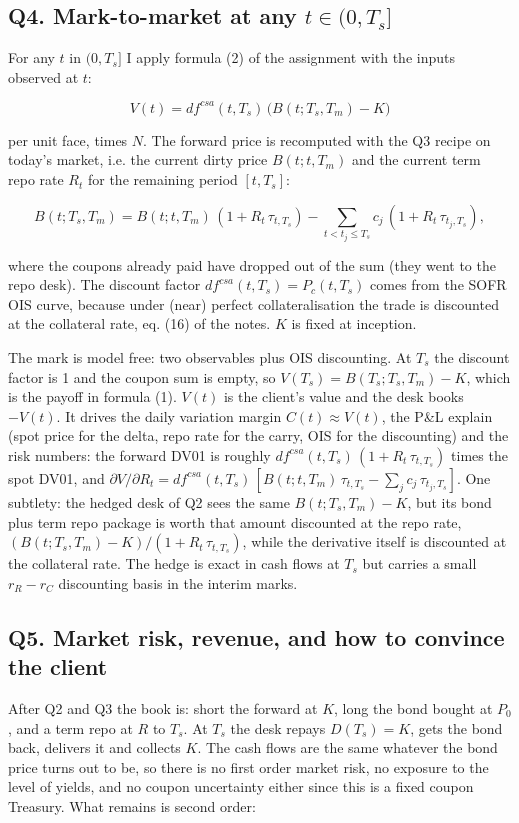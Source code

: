 \documentclass[11pt]{article}
\begin{document}
\subsection*{Q4. Mark-to-market at any $t \in (0, T_s]$}

For any $t$ in $(0,T_s]$ I apply formula (2) of the assignment with the inputs observed at $t$:

\[V(t) = df^{csa}(t,T_s)\,\bigl(B(t;T_s,T_m) - K\bigr)\]

per unit face, times $N$. The forward price is recomputed with the Q3 recipe on today's market, i.e. the current dirty price $B(t;t,T_m)$ and the current term repo rate $R_t$ for the remaining period $[t,T_s]$:

\[B(t;T_s,T_m) = B(t;t,T_m)\,(1 + R_t\,\tau_{t,T_s}) - \sum_{t<t_j\le T_s} c_j\,(1 + R_t\,\tau_{t_j,T_s}),\]

where the coupons already paid have dropped out of the sum (they went to the repo desk). The discount factor $df^{csa}(t,T_s) = P_c(t,T_s)$ comes from the SOFR OIS curve, because under (near) perfect collateralisation the trade is discounted at the collateral rate, eq. (16) of the notes. $K$ is fixed at inception.

The mark is model free: two observables plus OIS discounting. At $T_s$ the discount factor is 1 and the coupon sum is empty, so $V(T_s) = B(T_s;T_s,T_m) - K$, which is the payoff in formula (1). $V(t)$ is the client's value and the desk books $-V(t)$. It drives the daily variation margin $C(t) \approx V(t)$, the P\&L explain (spot price for the delta, repo rate for the carry, OIS for the discounting) and the risk numbers: the forward DV01 is roughly $df^{csa}(t,T_s)\,(1 + R_t\,\tau_{t,T_s})$ times the spot DV01, and $\partial V/\partial R_t = df^{csa}(t,T_s)\,[B(t;t,T_m)\,\tau_{t,T_s} - \sum_j c_j\,\tau_{t_j,T_s}]$. One subtlety: the hedged desk of Q2 sees the same $B(t;T_s,T_m) - K$, but its bond plus term repo package is worth that amount discounted at the repo rate, $(B(t;T_s,T_m) - K)/(1 + R_t\,\tau_{t,T_s})$, while the derivative itself is discounted at the collateral rate. The hedge is exact in cash flows at $T_s$ but carries a small $r_R - r_C$ discounting basis in the interim marks.

\subsection*{Q5. Market risk, revenue, and how to convince the client}

After Q2 and Q3 the book is: short the forward at $K$, long the bond bought at $P_0$, and a term repo at $R$ to $T_s$. At $T_s$ the desk repays $D(T_s) = K$, gets the bond back, delivers it and collects $K$. The cash flows are the same whatever the bond price turns out to be, so there is no first order market risk, no exposure to the level of yields, and no coupon uncertainty either since this is a fixed coupon Treasury. What remains is second order:
\end{document}

